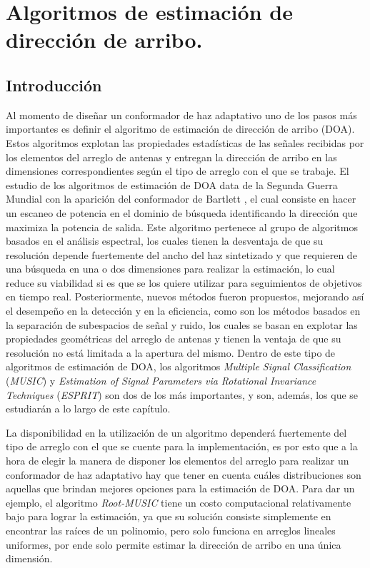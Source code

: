 \chapter{Algoritmos de estimación de dirección de arribo.}\label{ch:doaest}

\section{Introducción}\label{subc:doaest_intro}
Al momento de diseñar un conformador de haz adaptativo uno de los pasos más importantes es definir el algoritmo de estimación de dirección de arribo (DOA). Estos algoritmos explotan las propiedades estadísticas de las señales recibidas por los elementos del arreglo de antenas y entregan la dirección de arribo en las dimensiones correspondientes según el tipo de arreglo con el que se trabaje. El estudio de los algoritmos de estimación de DOA data de la Segunda Guerra Mundial con la aparición del conformador de Bartlett \cite{bib:2decadesbeamforming}, el cual consiste en hacer un escaneo de potencia en el dominio de búsqueda identificando la dirección que maximiza la potencia de salida. Este algoritmo pertenece al grupo de algoritmos basados en el análisis espectral, los cuales tienen la desventaja de que su resolución depende fuertemente del ancho del haz sintetizado y que requieren de una búsqueda en una o dos dimensiones para realizar la estimación, lo cual reduce su viabilidad si es que se los quiere utilizar para seguimientos de objetivos en tiempo real. Posteriormente, nuevos métodos fueron propuestos, mejorando así el desempeño en la detección y en la eficiencia, como son los métodos basados en la separación de subespacios de señal y ruido, los cuales se basan en explotar las propiedades geométricas del arreglo de antenas y tienen la ventaja de que su resolución no está limitada a la apertura del mismo. Dentro de este tipo de algoritmos de estimación de DOA, los algoritmos \emph{Multiple Signal Classification} (\emph{MUSIC}) y \emph{Estimation of Signal Parameters via Rotational Invariance Techniques} (\emph{ESPRIT}) son dos de los más importantes, y son, además, los que se estudiarán a lo largo de este capítulo.

La disponibilidad en la utilización de un algoritmo dependerá fuertemente del tipo de arreglo con el que se cuente para la implementación, es por esto que a la hora de elegir la manera de disponer los elementos del arreglo para realizar un conformador de haz adaptativo hay que tener en cuenta cuáles distribuciones son aquellas que brindan mejores opciones para la estimación de DOA. Para dar un ejemplo, el algoritmo \emph{Root-MUSIC} tiene un costo computacional relativamente bajo para lograr la estimación, ya que su solución consiste simplemente en encontrar las raíces de un polinomio, pero solo funciona en arreglos lineales uniformes, por ende solo permite estimar la dirección de arribo en una única dimensión.

